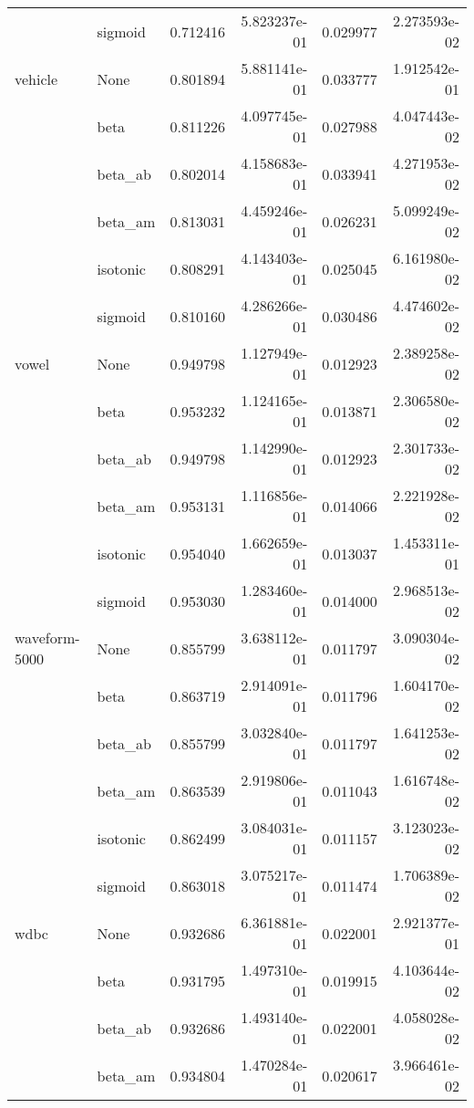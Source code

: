 \begin{tabular}{llrrrr}
        & sigmoid &  0.712416 &  5.823237e-01 &  0.029977 &  2.273593e-02 \\
vehicle & None &  0.801894 &  5.881141e-01 &  0.033777 &  1.912542e-01 \\
        & beta &  0.811226 &  4.097745e-01 &  0.027988 &  4.047443e-02 \\
        & beta\_ab &  0.802014 &  4.158683e-01 &  0.033941 &  4.271953e-02 \\
        & beta\_am &  0.813031 &  4.459246e-01 &  0.026231 &  5.099249e-02 \\
        & isotonic &  0.808291 &  4.143403e-01 &  0.025045 &  6.161980e-02 \\
        & sigmoid &  0.810160 &  4.286266e-01 &  0.030486 &  4.474602e-02 \\
vowel & None &  0.949798 &  1.127949e-01 &  0.012923 &  2.389258e-02 \\
        & beta &  0.953232 &  1.124165e-01 &  0.013871 &  2.306580e-02 \\
        & beta\_ab &  0.949798 &  1.142990e-01 &  0.012923 &  2.301733e-02 \\
        & beta\_am &  0.953131 &  1.116856e-01 &  0.014066 &  2.221928e-02 \\
        & isotonic &  0.954040 &  1.662659e-01 &  0.013037 &  1.453311e-01 \\
        & sigmoid &  0.953030 &  1.283460e-01 &  0.014000 &  2.968513e-02 \\
waveform-5000 & None &  0.855799 &  3.638112e-01 &  0.011797 &  3.090304e-02 \\
        & beta &  0.863719 &  2.914091e-01 &  0.011796 &  1.604170e-02 \\
        & beta\_ab &  0.855799 &  3.032840e-01 &  0.011797 &  1.641253e-02 \\
        & beta\_am &  0.863539 &  2.919806e-01 &  0.011043 &  1.616748e-02 \\
        & isotonic &  0.862499 &  3.084031e-01 &  0.011157 &  3.123023e-02 \\
        & sigmoid &  0.863018 &  3.075217e-01 &  0.011474 &  1.706389e-02 \\
wdbc & None &  0.932686 &  6.361881e-01 &  0.022001 &  2.921377e-01 \\
        & beta &  0.931795 &  1.497310e-01 &  0.019915 &  4.103644e-02 \\
        & beta\_ab &  0.932686 &  1.493140e-01 &  0.022001 &  4.058028e-02 \\
        & beta\_am &  0.934804 &  1.470284e-01 &  0.020617 &  3.966461e-02 \\

\end{tabular}
